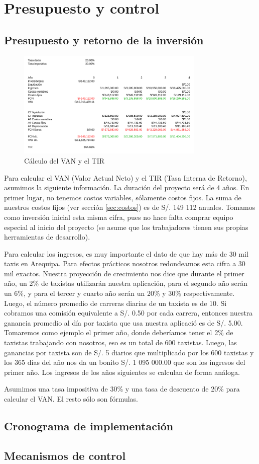 \chapter{Presupuesto y control}

\section{Presupuesto y retorno de la inversión}

\begin{figure}[htb]
\centering
\includegraphics[width=0.8\textwidth]{./img/van_tir}
\caption{Cálculo del VAN y el TIR} \label{fig:van_tir}
\end{figure}

Para calcular el VAN (Valor Actual Neto) y el TIR (Tasa Interna de Retorno), asumimos la siguiente información. La duración del proyecto será de 4 años. En primer lugar, no tenemos costos variables, sólamente costos fijos. La suma de nuestros costos fijos (ver sección \ref{sec:costos}) es de S/. 149 112 anuales. Tomamos como inversión inicial esta misma cifra, pues no hace falta comprar equipo especial al inicio del proyecto (se asume que los trabajadores tienen sus propias herramientas de desarrollo).

Para calcular los ingresos, es muy importante el dato de que hay más de 30 mil taxis en Arequipa. Para efectos prácticos nosotros redondeamos esta cifra a 30 mil exactos. Nuestra proyección de crecimiento nos dice que durante el primer año, un 2\% de taxistas utilizarán nuestra aplicación, para el segundo año serán un 6\%, y para el tercer y cuarto año serán un 20\% y 30\% respectivamente. Luego, el número promedio de carreras diarias de un taxista es de 10. Si cobramos una comisión equivalente a S/. 0.50 por cada carrera, entonces nuestra ganancia promedio al día por taxista que usa nuestra aplicació es de S/. 5.00. Tomaremos como ejemplo el primer año, donde deberíamos tener el 2\% de taxistas trabajando con nosotros, eso es un total de 600 taxistas. Luego, las ganancias por taxista son de S/. 5 diarios que multiplicado por los 600 taxistas y los 365 días del año nos da un bonito S/. 1 095 000.00 que son los ingresos del primer año. Los ingresos de los años siguientes se calculan de forma análoga.

Asumimos una tasa impositiva de 30\% y una tasa de descuento de 20\% para calcular el VAN. El resto sólo son fórmulas.

\section{Cronograma de implementación}

\section{Mecanismos de control}